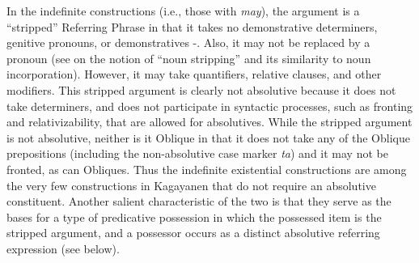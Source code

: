 \hspace*{-5.8pt}In the indefinite constructions (i.e., those with \textit{may}), the argument is a “stripped” Referring Phrase in that it takes no demonstrative determiners, genitive pronouns, or demonstratives -. Also, it may not be replaced by a pronoun (see \citealt{miner1986} on the notion of “noun stripping” and its similarity to noun incorporation). However, it may take quantifiers, relative clauses, and other modifiers. This stripped argument is clearly not absolutive because it does not take determiners, and does not participate in syntactic processes, such as fronting and relativizability, that are allowed for absolutives. While the stripped argument is not absolutive, neither is it Oblique in that it does not take any of the Oblique prepositions (including the non-absolutive case marker \textit{ta}) and it may not be fronted, as can Obliques. Thus the indefinite existential constructions are among the very few constructions in Kagayanen that do not require an absolutive constituent. Another salient characteristic of the two  is that they serve as the bases for a type of predicative possession in which the possessed item is the stripped argument, and a possessor occurs as a distinct absolutive referring expression (see  below).


